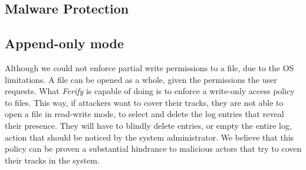 %
%
%

\subsection{Malware Protection}

\subsection{Append-only mode}

\par Although we could not enforce partial write permissions to a file, due to the \ac{OS} limitations. A file can be opened as a whole, given the permissions the user requests. What \emph{Ferify} is capable of doing is to enforce a write-only access policy to files. This way, if attackers want to cover their tracks, they are not able to open a file in read-write mode, to select and delete the log entries that reveal their presence. They will have to blindly delete entries, or empty the entire log, action that should be noticed by the system administrator. We believe that this policy can be proven a substantial hindrance to malicious actors that try to coven their tracks in the system.

